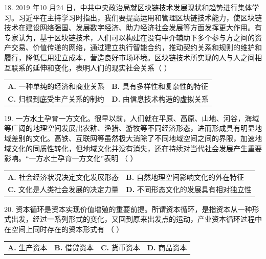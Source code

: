 \documentclass[UTF8,11pt]{ctexart}
\begin{document}
18. 2019 年10 月24 日，中共中央政治局就区块链技术发展现状和趋势进行集体学习。习近平在主持学习时指出，我们要提高运用和管理区块链技术能力，使区块链技术在建设网络强国、发展数字经济、助力经济社会发展等方面发挥更大作用。有专家认为，基于区块链技术，人们可以构建在没有中介辅助下多个参与方之间的资产交易、价值传递的网络，通过建立执行智能合约，推动契约关系和规则的维护和履行，降低信用建立成本，营造良好市场环境。区块链技术所实现的人与人之间相互联系的延伸和变化，表明人们的现实社会关系（    ）


\begin{center}\begin{tabular}{>{\raggedright\arraybackslash}p{\dimexpr(\linewidth-4\tabcolsep)/2\relax}>{\raggedright\arraybackslash}p{\dimexpr(\linewidth-4\tabcolsep)/2\relax}}
\textbf{A.} 一种单纯的经济和商业关系 & \textbf{B.} 具有多样性和复杂性的特征\\[.35em]
\textbf{C.} 归根到底受生产关系的制约 & \textbf{D.} 由信息技术构造的虚拟关系\\[.35em]\end{tabular}\end{center}

19. 一方水土孕育一方文化。很早以前，人们就在平原、高原、山地、河谷，海域等广阔的地理空间发展出农耕、渔猎、游牧等不同经济形态，进而形成具有明显地域差别的文化。高铁、互联网等虽然极大消除了不同地域空间之间的界限，加速地域文化的同质性转化，但地域文化并没有消失，还在持续对当代社会发展产生重要影响。“一方水土孕育一方文化”表明 （    ）


\begin{center}\begin{tabular}{>{\raggedright\arraybackslash}p{\dimexpr(\linewidth-4\tabcolsep)/2\relax}>{\raggedright\arraybackslash}p{\dimexpr(\linewidth-4\tabcolsep)/2\relax}}
\textbf{A.} 社会经济状况决定文化发展形态 & \textbf{B.} 自然地理空间影响文化的外在特征\\[.35em]
\textbf{C.} 文化是人类社会发展的决定力量 & \textbf{D.} 不同形态文化的发展具有相对独立性\\[.35em]\end{tabular}\end{center}

20. 资本循环是资本实现价值增殖的重要前提。所谓资本循环，是指资本从一种形式出发，经过一系列形式的变化，又回到原来出发点的运动，产业资本循环过程中在空间上同时存在的资本形式有 （    ）


\begin{center}\begin{tabular}{>{\raggedright\arraybackslash}p{\dimexpr(\linewidth-8\tabcolsep)/4\relax}>{\raggedright\arraybackslash}p{\dimexpr(\linewidth-8\tabcolsep)/4\relax}>{\raggedright\arraybackslash}p{\dimexpr(\linewidth-8\tabcolsep)/4\relax}>{\raggedright\arraybackslash}p{\dimexpr(\linewidth-8\tabcolsep)/4\relax}}
\textbf{A.} 生产资本 & \textbf{B.} 借贷资本 & \textbf{C.} 货币资本 & \textbf{D.} 商品资本\\[.35em]\end{tabular}\end{center}
\end{document}
